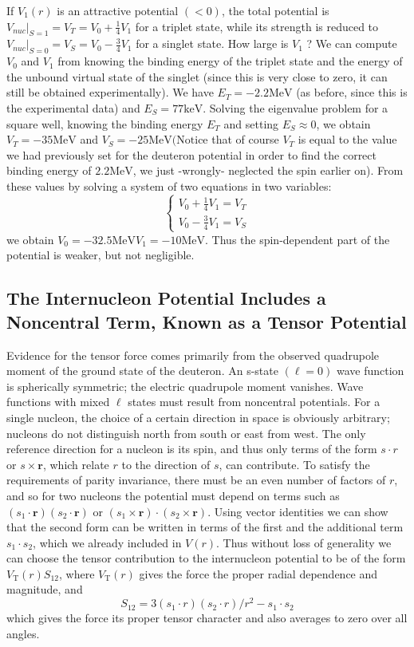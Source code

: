 If $V_{1}(r)$ is an attractive potential $(<0)$, the total potential is $\left.V_{n u c}\right|_{S=1}=V_{T}=V_{0}+\frac{1}{4} V_{1}$ for a triplet state, while its strength is reduced to $\left.V_{n u c}\right|_{S=0}=V_{S}=V_{0}-\frac{3}{4} V_{1}$ for a singlet state. How large is $V_{1}$ ?
We can compute $V_{0}$ and $V_{1}$ from knowing the binding energy of the triplet state and the energy of the unbound virtual state of the singlet (since this is very close to zero, it can still be obtained experimentally). We have $E_{T}=-2.2 \mathrm{MeV}$ (as before, since this is the experimental data) and $E_{S}=77 \mathrm{keV}$. Solving the eigenvalue problem for a square well, knowing the binding energy $E_{T}$ and setting $E_{S} \approx 0$, we obtain $V_{T}=-35 \mathrm{MeV}$ and $V_{S}=-25 \mathrm{MeV}(\mathrm{Notice}$ that of course $V_{T}$ is equal to the value we had previously set for the deuteron potential in order to find the correct binding energy of $2.2 \mathrm{MeV}$, we just -wrongly- neglected the spin earlier on). From these values by solving a system of two equations in two variables:
$$
\left\{\begin{array}{l}
V_{0}+\frac{1}{4} V_{1}=V_{T} \\
V_{0}-\frac{3}{4} V_{1}=V_{S}
\end{array}\right.
$$
we obtain $V_{0}=-32.5 \mathrm{MeV} V_{1}=-10 \mathrm{MeV}$. Thus the spin-dependent part of the potential is weaker, but not negligible.
\subsection{The Internucleon Potential Includes a Noncentral Term, Known as a Tensor Potential}
Evidence for the tensor force comes primarily from the observed quadrupole moment of the ground state of the deuteron. An s-state $(\ell=0)$ wave function is spherically symmetric; the electric quadrupole moment vanishes. Wave functions with mixed $\ell$ states must result from noncentral potentials. For a single nucleon, the choice of a certain direction in space is obviously arbitrary; nucleons do not distinguish north from south or east from west. The only reference direction for a nucleon is its spin, and thus only terms of the form $s \cdot r$ or $s \times \boldsymbol{r}$, which relate $r$ to the direction of $s$, can contribute. To satisfy the requirements of parity invariance, there must be an even number of factors of $r$, and so for two nucleons the potential must depend on terms such as $\left(s_{1} \cdot \boldsymbol{r}\right)\left(s_{2} \cdot \boldsymbol{r}\right)$ or $\left(s_{1} \times \boldsymbol{r}\right) \cdot\left(s_{2} \times \boldsymbol{r}\right)$.
Using vector identities we can show that the second form can be written in terms of the first and the additional term $s_{1} \cdot s_{2}$, which we already included in $V(r)$. Thus without loss of generality we can choose the tensor contribution to the internucleon potential to be of the form $V_{\mathrm{T}}(r) S_{12}$, where $V_{\mathrm{T}}(r)$ gives the force the proper radial dependence and magnitude, and
$$S_{12}=3\left(s_{1} \cdot r\right)\left(s_{2} \cdot r\right) / r^{2}-s_{1} \cdot s_{2}$$
which gives the force its proper tensor character and also averages to zero over all angles.
